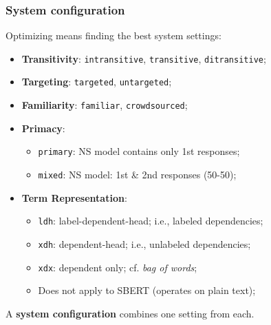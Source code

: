 \documentclass[handout,xcolor={dvipsnames}]{beamer}
\newcommand{\param}[1]{\texttt{#1}}
\begin{document}
\begin{frame}
\frametitle{System configuration}
\small

\vspace{.8em}
Optimizing means finding the best system settings:

\begin{itemize}
\pause
\item \textbf{Transitivity}: \param{intransitive}, \param{transitive}, \param{ditransitive};
\pause
\item \textbf{Targeting}: \param{targeted}, \param{untargeted};
\pause
\item \textbf{Familiarity}: \param{familiar}, \param{crowdsourced};
\pause
\item \textbf{Primacy}:
\begin{itemize}
\item \param{primary}: NS model contains only 1st responses;
\item \param{mixed}: NS model: 1st \& 2nd responses (50-50);
\end{itemize}
\pause
\item \textbf{Term Representation}:
\begin{itemize}
\item \param{ldh}: label-dependent-head; i.e., labeled dependencies;
\item \param{xdh}: dependent-head; i.e., unlabeled dependencies;
\item \param{xdx}: dependent only; cf. \textit{bag of words};
\item Does not apply to SBERT (operates on plain text);
\end{itemize}
\end{itemize}

\vspace{.3em}
\pause
A \textbf{system configuration} combines one setting from each.

\end{frame}




%
%
\end{document}
